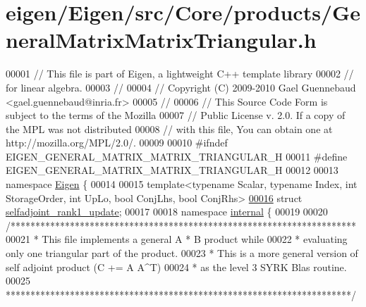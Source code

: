 \hypertarget{eigen_2_eigen_2src_2_core_2products_2_general_matrix_matrix_triangular_8h_source}{}\section{eigen/\+Eigen/src/\+Core/products/\+General\+Matrix\+Matrix\+Triangular.h}
\label{eigen_2_eigen_2src_2_core_2products_2_general_matrix_matrix_triangular_8h_source}

\begin{DoxyCode}
00001 \textcolor{comment}{// This file is part of Eigen, a lightweight C++ template library}
00002 \textcolor{comment}{// for linear algebra.}
00003 \textcolor{comment}{//}
00004 \textcolor{comment}{// Copyright (C) 2009-2010 Gael Guennebaud <gael.guennebaud@inria.fr>}
00005 \textcolor{comment}{//}
00006 \textcolor{comment}{// This Source Code Form is subject to the terms of the Mozilla}
00007 \textcolor{comment}{// Public License v. 2.0. If a copy of the MPL was not distributed}
00008 \textcolor{comment}{// with this file, You can obtain one at http://mozilla.org/MPL/2.0/.}
00009 
00010 \textcolor{preprocessor}{#ifndef EIGEN\_GENERAL\_MATRIX\_MATRIX\_TRIANGULAR\_H}
00011 \textcolor{preprocessor}{#define EIGEN\_GENERAL\_MATRIX\_MATRIX\_TRIANGULAR\_H}
00012 
00013 \textcolor{keyword}{namespace }\hyperlink{namespace_eigen}{Eigen} \{ 
00014 
00015 \textcolor{keyword}{template}<\textcolor{keyword}{typename} Scalar, \textcolor{keyword}{typename} Index, \textcolor{keywordtype}{int} StorageOrder, \textcolor{keywordtype}{int} UpLo, \textcolor{keywordtype}{bool} ConjLhs, \textcolor{keywordtype}{bool} ConjRhs>
\hyperlink{struct_eigen_1_1selfadjoint__rank1__update}{00016} \textcolor{keyword}{struct }\hyperlink{struct_eigen_1_1selfadjoint__rank1__update}{selfadjoint\_rank1\_update};
00017 
00018 \textcolor{keyword}{namespace }\hyperlink{namespaceinternal}{internal} \{
00019 
00020 \textcolor{comment}{/**********************************************************************}
00021 \textcolor{comment}{* This file implements a general A * B product while}
00022 \textcolor{comment}{* evaluating only one triangular part of the product.}
00023 \textcolor{comment}{* This is a more general version of self adjoint product (C += A A^T)}
00024 \textcolor{comment}{* as the level 3 SYRK Blas routine.}
00025 \textcolor{comment}{**********************************************************************/}

\end{DoxyCode}
